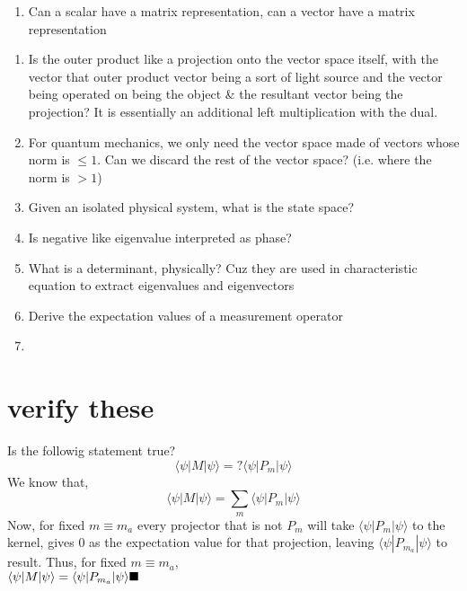 \documentclass{article}
\begin{document}
\begin{enumerate}
\begin{enumerate}
    \item Can a scalar have a matrix representation, can a vector have a matrix representation
    \end{enumerate}
    \begin{enumerate}    
    \item Is the outer product like a projection onto the vector space itself, with the vector that outer product vector being a sort of light source and the vector being operated on being the object \& the resultant vector being the projection? It is essentially an additional left multiplication with the dual.
    \item For quantum mechanics, we only need the vector space made of vectors whose norm is $\le 1$. Can we discard the rest of the vector space? (i.e. where the norm is $> 1$)
    \item Given an isolated physical system, what is the state space?
    \item Is negative like eigenvalue interpreted as phase?
    \item What is a determinant, physically? Cuz they are used in characteristic equation to extract eigenvalues and eigenvectors
    \item Derive the expectation values of a measurement operator
    \item 

    \end{enumerate}

    \end{enumerate}
    
\section{verify these}

Is the followig statement true? \\
$$ \langle\psi|M|\psi\rangle = ? \langle\psi|P_m|\psi\rangle$$
We know that, \\
$$\langle\psi|M|\psi\rangle = \sum_m \langle\psi|P_m|\psi\rangle $$
Now, for fixed $ m \equiv m_a $ every projector that is not $P_m$ will take $\langle\psi|P_m|\psi\rangle$ to the kernel, gives 0 as the expectation value for that projection, leaving $\langle\psi|P_{m_a}|\psi\rangle$ to result. Thus, for fixed $ m \equiv m_a $, \\
$ \langle\psi|M|\psi\rangle = \langle\psi|P_{m_a}|\psi\rangle \\\blacksquare$
\end{document}
